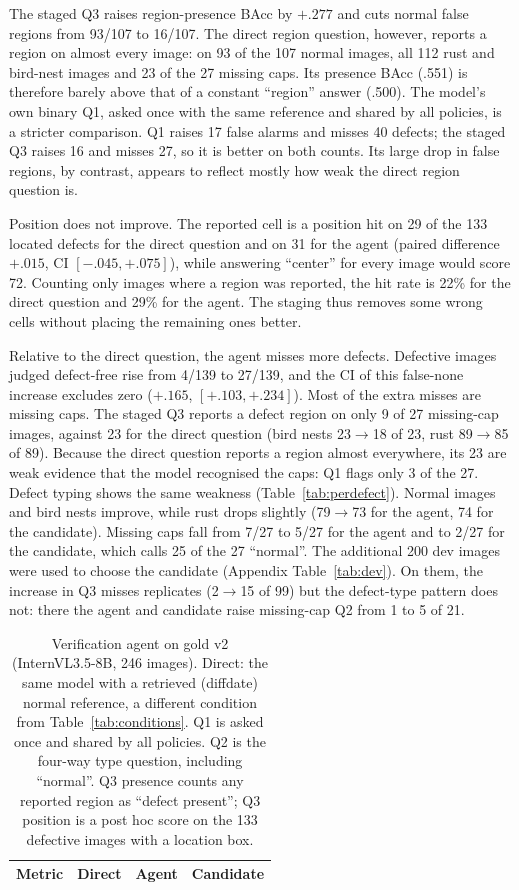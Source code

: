 \documentclass[11pt]{article}
\begin{document}
The staged Q3 raises region-presence BAcc by $+.277$ and cuts normal false regions from 93/107 to 16/107. The direct region question, however, reports a region on almost every image: on 93 of the 107 normal images, all 112 rust and bird-nest images and 23 of the 27 missing caps. Its presence BAcc (.551) is therefore barely above that of a constant ``region'' answer (.500). The model's own binary Q1, asked once with the same reference and shared by all policies, is a stricter comparison. Q1 raises 17 false alarms and misses 40 defects; the staged Q3 raises 16 and misses 27, so it is better on both counts. Its large drop in false regions, by contrast, appears to reflect mostly how weak the direct region question is.

Position does not improve. The reported cell is a position hit on 29 of the 133 located defects for the direct question and on 31 for the agent (paired difference $+.015$, CI $[-.045,+.075]$), while answering ``center'' for every image would score 72. Counting only images where a region was reported, the hit rate is 22\% for the direct question and 29\% for the agent. The staging thus removes some wrong cells without placing the remaining ones better.

Relative to the direct question, the agent misses more defects. Defective images judged defect-free rise from 4/139 to 27/139, and the CI of this false-none increase excludes zero ($+.165$, $[+.103,+.234]$). Most of the extra misses are missing caps. The staged Q3 reports a defect region on only 9 of 27 missing-cap images, against 23 for the direct question (bird nests 23$\rightarrow$18 of 23, rust 89$\rightarrow$85 of 89). Because the direct question reports a region almost everywhere, its 23 are weak evidence that the model recognised the caps: Q1 flags only 3 of the 27. Defect typing shows the same weakness (Table~\ref{tab:perdefect}). Normal images and bird nests improve, while rust drops slightly (79$\rightarrow$73 for the agent, 74 for the candidate). Missing caps fall from 7/27 to 5/27 for the agent and to 2/27 for the candidate, which calls 25 of the 27 ``normal''. The additional 200 dev images were used to choose the candidate (Appendix Table~\ref{tab:dev}). On them, the increase in Q3 misses replicates (2$\rightarrow$15 of 99) but the defect-type pattern does not: there the agent and candidate raise missing-cap Q2 from 1 to 5 of 21.

\begin{table}[t]
\centering
\caption{Verification agent on gold v2 (InternVL3.5-8B, 246 images). Direct: the same model with a retrieved (diffdate) normal reference, a different condition from Table~\ref{tab:conditions}. Q1 is asked once and shared by all policies. Q2 is the four-way type question, including ``normal''. Q3 presence counts any reported region as ``defect present''; Q3 position is a post hoc score on the 133 defective images with a location box.}
\label{tab:agent}
\begin{tabular}{lrrr}
\toprule
Metric & Direct & Agent & Candidate \\
\midrule

\bottomrule
\end{tabular}
\end{table}
\end{document}
